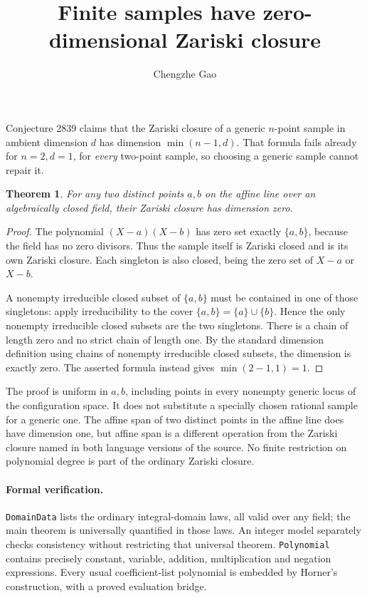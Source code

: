 \documentclass[11pt]{article}
\newtheorem{theorem}{Theorem}
\begin{document}
\title{Finite samples have zero-dimensional Zariski closure}
\author{Chengzhe Gao}\date{}\maketitle
Conjecture 2839 claims that the Zariski closure of a generic $n$-point
sample in ambient dimension $d$ has dimension $\min(n-1,d)$.
That formula fails already for $n=2,d=1$, for \emph{every} two-point
sample, so choosing a generic sample cannot repair it.

\begin{theorem}
For any two distinct points $a,b$ on the affine line over an algebraically
closed field, their Zariski closure has dimension zero.
\end{theorem}
\begin{proof}
The polynomial $(X-a)(X-b)$ has zero set exactly $\{a,b\}$, because the
field has no zero divisors. Thus the sample itself is Zariski closed and
is its own Zariski closure. Each singleton is also closed, being the zero
set of $X-a$ or $X-b$.

A nonempty irreducible closed subset of $\{a,b\}$ must be contained in
one of those singletons: apply irreducibility to the cover
$\{a,b\}=\{a\}\cup\{b\}$. Hence the only nonempty irreducible closed
subsets are the two singletons. There is a chain of length zero and no
strict chain of length one. By the standard dimension definition using
chains of nonempty irreducible closed subsets, the dimension is exactly
zero. The asserted formula instead gives $\min(2-1,1)=1$.
\end{proof}

The proof is uniform in $a,b$, including points in every nonempty generic
locus of the configuration space. It does not substitute a specially
chosen rational sample for a generic one. The affine span of two distinct
points in the affine line does have dimension one, but affine span is a
different operation from the Zariski closure named in both language
versions of the source. No finite restriction on polynomial degree is
part of the ordinary Zariski closure.

\paragraph{Formal verification.}
\texttt{DomainData} lists the ordinary integral-domain laws, all valid
over any field; the main theorem is universally quantified in those laws.
An integer model separately checks consistency without restricting that
universal theorem. \texttt{Polynomial} contains precisely constant,
variable, addition, multiplication and negation expressions. Every usual
coefficient-list polynomial is embedded by Horner's construction, with
a proved evaluation bridge.
\end{document}

